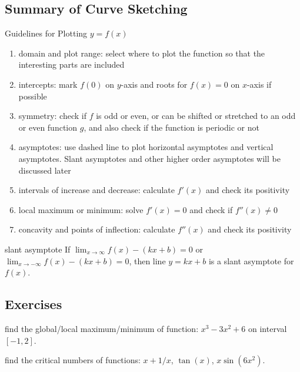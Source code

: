 \documentclass[Calculus 1 Recitation.tex]{subfiles}
\begin{document}
\subsection{Summary of Curve Sketching}
\begin{myleftlinebox}
	Guidelines for Plotting $y=f(x)$
	\tcblower
	\begin{enumerate}
		\item domain and plot range: select where to plot the function so that the interesting parts are included
		\item intercepts: mark $f(0)$ on $y$-axis and roots for $f(x)=0$ on $x$-axis if possible
		\item symmetry: check if $f$ is odd or even, or can be shifted or stretched to an odd or even function $g$, and also check if the function is periodic or not
		\item asymptotes: use dashed line to plot horizontal asymptotes and vertical asymptotes. Slant asymptotes and other higher order asymptotes will be discussed later
		\item intervals of increase and decrease: calculate $f'(x)$ and check its positivity
		\item local maximum or minimum: solve $f'(x)=0$ and check if $f''(x)\neq 0$
		\item concavity and points of inflection: calculate $f''(x)$ and check its positivity
	\end{enumerate}
\end{myleftlinebox}

\begin{myleftlinebox}
	slant asymptote
	\tcblower
	If $\lim_{x\to\infty} f(x)-(kx+b)=0$ or $\lim_{x\to-\infty} f(x)-(kx+b)=0$, then line $y=kx+b$ is a slant asymptote for $f(x)$.
\end{myleftlinebox}

\subsection{Exercises}

\begin{myleftlinebox}
	find the global/local maximum/minimum of function: $x^3-3x^2+6$ on interval $[-1,2]$.
	\tcblower
	\vspace{2em}	
\end{myleftlinebox}

\begin{myleftlinebox}
	find the critical numbers of functions: $x+1/x$, $\tan(x)$, $x\sin(6x^2)$.
	\tcblower
	\vspace{2em}	
\end{myleftlinebox}
\end{document}
